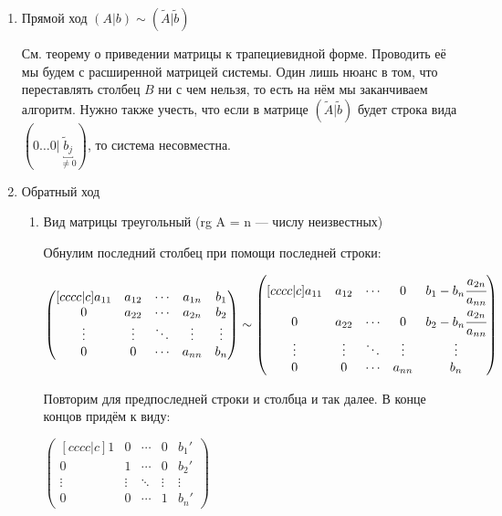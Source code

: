 \begin{enumerate}
    \item Прямой ход $(A|b) \sim (\tilde{A}|\tilde{b})$
    
          См. теорему о приведении матрицы к трапециевидной форме. Проводить её мы будем с расширенной матрицей системы. Один лишь нюанс в том, что переставлять столбец \(B\) ни с чем нельзя, то есть на нём мы заканчиваем алгоритм.
          Нужно также учесть, что если в матрице $(\tilde{A}|\tilde{b})$ будет строка вида $(0 \dots 0 | \underbracket{\tilde{b}_j}_{\neq 0})$, то система несовместна.

    \item Обратный ход

          \begin{enumerate}
              \item Вид матрицы треугольный (rg A = n --- числу неизвестных)

                    Обнулим последний столбец при помощи последней строки:

                    \(
                    \begin{pmatrix}[cccc|c]
                        a_{11} & a_{12} & \cdots & a_{1n} & b_1    \\
                        0      & a_{22} & \cdots & a_{2n} & b_2    \\
                        \vdots & \vdots & \ddots & \vdots & \vdots \\
                        0      & 0      & \cdots & a_{nn} & b_n
                    \end{pmatrix} \sim
                    \begin{pmatrix}[cccc|c]
                        a_{11} & a_{12} & \cdots & 0      & b_1 - b_n \cfrac{a_{2n}}{a_{nn}} \\
                        0      & a_{22} & \cdots & 0      & b_2 - b_n \cfrac{a_{2n}}{a_{nn}} \\
                        \vdots & \vdots & \ddots & \vdots & \vdots                           \\
                        0      & 0      & \cdots & a_{nn} & b_n
                    \end{pmatrix}
                    \)

                    Повторим для предпоследней строки и столбца и так далее. В конце концов придём к виду:

                    \(
                    \begin{pmatrix}[cccc|c]
                        1      & 0      & \cdots & 0      & b_1'   \\
                        0      & 1      & \cdots & 0      & b_2'   \\
                        \vdots & \vdots & \ddots & \vdots & \vdots \\
                        0      & 0      & \cdots & 1      & b_n'
                    \end{pmatrix}
                    \)


\end{enumerate}
\end{enumerate}
